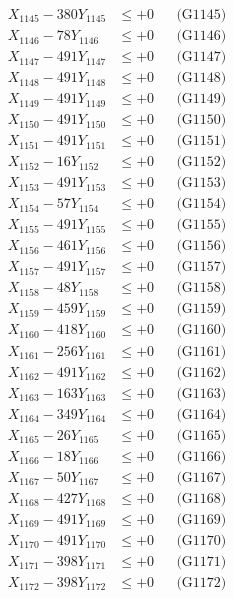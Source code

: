 \documentclass[a4paper,10pt]{article}
\begin{document}
{\begin{align}
X_{1145} - 380Y_{1145} &\leq +0 && \text{(G1145)} \\
X_{1146} - 78Y_{1146} &\leq +0 && \text{(G1146)} \\
X_{1147} - 491Y_{1147} &\leq +0 && \text{(G1147)} \\
X_{1148} - 491Y_{1148} &\leq +0 && \text{(G1148)} \\
X_{1149} - 491Y_{1149} &\leq +0 && \text{(G1149)} \\
X_{1150} - 491Y_{1150} &\leq +0 && \text{(G1150)} \\
\allowbreak
X_{1151} - 491Y_{1151} &\leq +0 && \text{(G1151)} \\
X_{1152} - 16Y_{1152} &\leq +0 && \text{(G1152)} \\
X_{1153} - 491Y_{1153} &\leq +0 && \text{(G1153)} \\
X_{1154} - 57Y_{1154} &\leq +0 && \text{(G1154)} \\
X_{1155} - 491Y_{1155} &\leq +0 && \text{(G1155)} \\
X_{1156} - 461Y_{1156} &\leq +0 && \text{(G1156)} \\
X_{1157} - 491Y_{1157} &\leq +0 && \text{(G1157)} \\
X_{1158} - 48Y_{1158} &\leq +0 && \text{(G1158)} \\
X_{1159} - 459Y_{1159} &\leq +0 && \text{(G1159)} \\
X_{1160} - 418Y_{1160} &\leq +0 && \text{(G1160)} \\
\allowbreak
X_{1161} - 256Y_{1161} &\leq +0 && \text{(G1161)} \\
X_{1162} - 491Y_{1162} &\leq +0 && \text{(G1162)} \\
X_{1163} - 163Y_{1163} &\leq +0 && \text{(G1163)} \\
X_{1164} - 349Y_{1164} &\leq +0 && \text{(G1164)} \\
X_{1165} - 26Y_{1165} &\leq +0 && \text{(G1165)} \\
X_{1166} - 18Y_{1166} &\leq +0 && \text{(G1166)} \\
X_{1167} - 50Y_{1167} &\leq +0 && \text{(G1167)} \\
X_{1168} - 427Y_{1168} &\leq +0 && \text{(G1168)} \\
X_{1169} - 491Y_{1169} &\leq +0 && \text{(G1169)} \\
X_{1170} - 491Y_{1170} &\leq +0 && \text{(G1170)} \\
\allowbreak
X_{1171} - 398Y_{1171} &\leq +0 && \text{(G1171)} \\
X_{1172} - 398Y_{1172} &\leq +0 && \text{(G1172)} \\

\end{align}}
\end{document}
